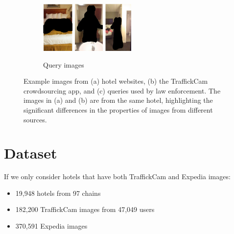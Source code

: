 \documentclass[letterpaper]{article} %
\begin{document}
\begin{figure}
\begin{subfigure}[b]{.6\textwidth}
    \end{subfigure}
   \begin{subfigure}[b]{.3\textwidth}
   \centering
    \includegraphics[height=1in]{figures/example_images/queries/1.png}
    \includegraphics[height=1in]{figures/example_images/queries/2.png}
    \includegraphics[height=1in]{figures/example_images/queries/3.png}
    \caption{Query images}
    \end{subfigure}
    \caption[Image variability from different sources]{Example images from (a) hotel websites, (b) the TraffickCam crowdsourcing app, and (c) queries used by law enforcement. The images in (a) and (b) are from the same hotel, highlighting the significant differences in the properties of images from different sources.}
    \label{fig:domainImages}
\end{figure}

\section{Dataset}

If we only consider hotels that have both TraffickCam and Expedia images:
\begin{itemize}
\item 19,948 hotels from 97 chains
\item 182,200 TraffickCam images from 47,049 users
\item 370,591 Expedia images
\end{itemize}
\end{document}
